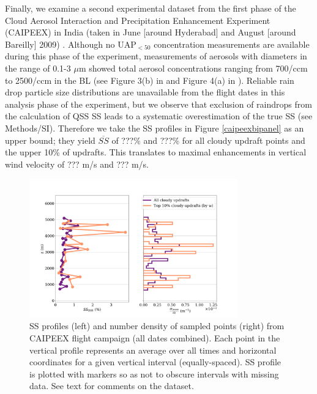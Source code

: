 \documentclass{article}
\begin{document}
Finally, we examine a second experimental dataset from the first phase of the Cloud Aerosol Interaction and Precipitation Enhancement Experiment (CAIPEEX) in India (taken in June [around Hyderabad] and August [around Bareilly] 2009) \cite{Kulkarni2012}. Although no UAP$_{<50}$ concentration measurements are available during this phase of the experiment, measurements of aerosols with diameters in the range of 0.1-3 $\mu$m showed total aerosol concentrations ranging from 700/ccm to 2500/ccm in the BL (see Figure 3(b) in \cite{Prabha2011} and Figure 4(a) in \cite{Kulkarni2012}). Reliable rain drop particle size distributions are unavailable from the flight dates in this analysis phase of the experiment, but we observe that exclusion of raindrops from the calculation of QSS SS leads to a systematic overestimation of the true SS (see Methods/SI). Therefore we take the SS profiles in Figure \ref{caipeexbipanel} as an upper bound; they yield $\overline{SS}$ of ???\% and ???\% for all cloudy updraft points and the upper 10\% of updrafts. This translates to maximal enhancements in vertical wind velocity of ??? m/s and ??? m/s.


\begin{figure}[ht]
    \centering
    \includegraphics[width=9cm]{revcaipeex/v1_FINAL_combined_bipanel_ss_qss_vs_z_figure.png}
    \caption{SS profiles (left) and number density of sampled points (right) from CAIPEEX flight campaign (all dates combined). Each point in the vertical profile represents an average over all times and horizontal coordinates for a given vertical interval (equally-spaced). SS profile is plotted with markers so as not to obscure intervals with missing data. See text for comments on the dataset.}
    \label{caipeexqsshist}
\end{figure}
\end{document}
